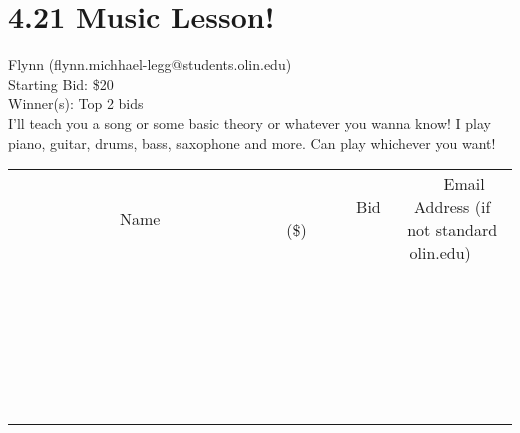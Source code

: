 \documentclass[11pt]{article}
\begin{document}
\section*{4.21 Music Lesson!}
Flynn (flynn.michhael-legg@students.olin.edu) \\
Starting Bid: \$20 \\
Winner(s): 
Top 2 bids \\
I'll teach you a song or some basic theory or whatever you wanna know! I play piano, guitar, drums, bass, saxophone and more. Can play whichever you want! \\[6ex]
\begin{tabular}{c c c}
~~~~~~~~~~~~~Name~~~~~~~~~~~~~ & ~~~~~~~~~Bid (\$)~~~~~~~~~ & ~~~Email Address (if not standard olin.edu)~~~ \\
 & & \\
\hline
 & & \\
\hline
 & & \\
\hline
 & & \\
\hline
 & & \\
\hline
 & & \\
\hline
 & & \\
\hline
 & & \\
\hline
 & & \\
\hline
 & & \\
\hline
 & & \\
\hline
 & & \\
\hline
 & & \\
\hline
 & & \\
\hline
 & & \\
\hline
 & & \\
\hline
 & & \\
\hline
 & & \\
\hline
 & & \\
\hline
 & & \\
\hline
 & & \\
\hline
 & & \\
\hline
 & & \\
\hline
 & & \\
\hline
 & & \\
\hline
 & & \\
\hline
\end{tabular}
\clearpage
\end{document}
